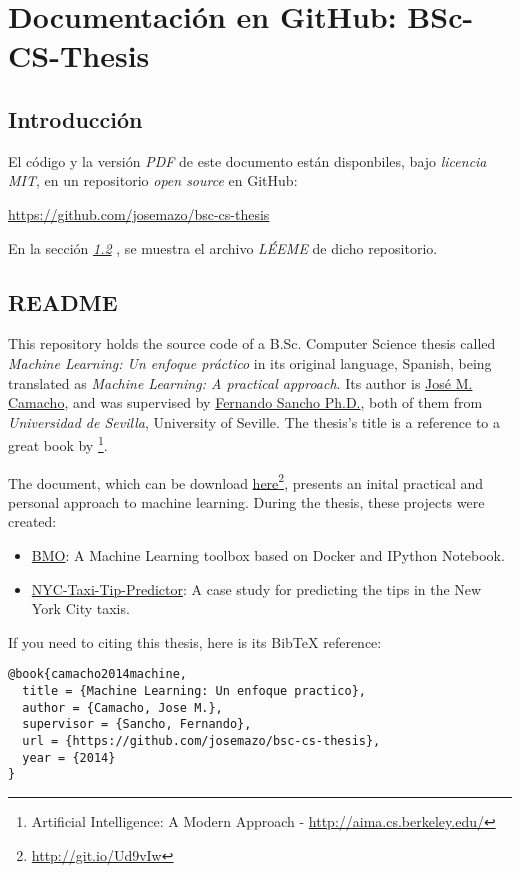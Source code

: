 \chapter{Documentación en GitHub: BSc-CS-Thesis} \label{chap:ap_c}

\vspace*{5mm}

\section{Introducción} \label{sec:c.1}

El código  y la versión \emph{PDF} de este documento están disponbiles, bajo \emph{licencia MIT}, en un repositorio \emph{open source} en GitHub:

\url{https://github.com/josemazo/bsc-cs-thesis}

En la sección \emph{\ref{sec:c.2} }, se muestra el archivo \emph{LÉEME} de dicho repositorio.

\section{README} \label{sec:c.2}

This repository holds the  source code of a B.Sc. Computer Science thesis called \emph{Machine Learning: Un enfoque práctico} in its original language, Spanish, being translated as \emph{Machine Learning: A practical approach}. Its author is \href{https://github.com/josemazo}{José M. Camacho}, and was supervised by \href{http://www.cs.us.es/~fsancho/}{Fernando Sancho Ph.D.}, both of them from \emph{Universidad de Sevilla}, University of Seville. The thesis's title is a reference to a great book by \citeauthor{russell2003artificial}\footnote{Artificial Intelligence: A Modern Approach - \url{http://aima.cs.berkeley.edu/}}.

The document, which can be download \href{https://github.com/josemazo/bsc-cs-thesis/releases/download/deliverable/jose-m-camacho-bsc-cs-thesis.pdf}{here}\footnote{\url{http://git.io/Ud9vIw}}, presents an inital practical and personal approach to machine learning. During the thesis, these projects were created:

\begin{itemize}
\item[\textbullet]\href{https://github.com/josemazo/bmo}{BMO}: A Machine Learning toolbox based on Docker and IPython Notebook.
\item[\textbullet]\href{https://github.com/josemazo/nyc-taxi-tip-predictor}{NYC-Taxi-Tip-Predictor}: A case study for predicting the tips in the New York City taxis.
\end{itemize}

If you need to citing this thesis, here is its BibTeX reference:

\vspace*{3mm}
\lstset{style=bibtex}
\begin{lstlisting}
@book{camacho2014machine,
  title = {Machine Learning: Un enfoque practico},
  author = {Camacho, Jose M.},
  supervisor = {Sancho, Fernando},
  url = {https://github.com/josemazo/bsc-cs-thesis},
  year = {2014}
}
\end{lstlisting}
